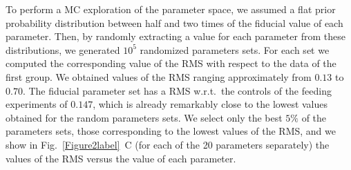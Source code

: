 \documentclass[oneside, 10pt, a4paper, twocolumn]{article}
\begin{document}
To perform a MC exploration of the parameter space, we assumed a flat prior probability distribution between half and two times of the fiducial value of each parameter. 
Then, by randomly extracting a value for each parameter from these distributions, we generated $10^5$ randomized parameters sets. 
For each set we computed the corresponding value of the RMS with respect to the data of the first group. We obtained values of the RMS ranging approximately from $0.13$ to $0.70$. 
The fiducial parameter set has a RMS w.r.t.~the controls of the feeding experiments of $0.147$, which is already remarkably close to the lowest values obtained for the random parameters sets. 
We select only the best $5\%$ of the parameters sets, those corresponding to the lowest values of the RMS, 
and we show in Fig.~\ref{Figure2label}~C (for each of the 20 parameters separately) the values of the RMS versus the value of each parameter. 
\end{document}
